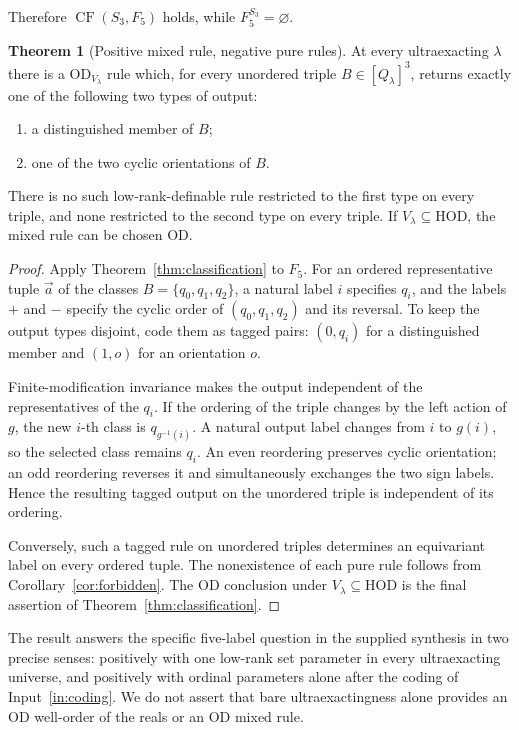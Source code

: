 \documentclass[11pt,letterpaper]{article}
\theoremstyle{definition}
\newtheorem{theorem}[definition]{Theorem}
\numberwithin{equation}{section}
\newcommand{\HOD}{\mathrm{HOD}}
\newcommand{\OD}{\mathrm{OD}}
\newcommand{\CF}{\operatorname{CF}}
\begin{document}
Therefore $\CF(S_3,F_5)$ holds, while $F_5^{S_3}=\varnothing$.

\begin{theorem}[Positive mixed rule, negative pure rules]\label{thm:hybrid}
At every ultraexacting $\lambda$ there is a $\OD_{V_\lambda}$ rule which, for every unordered triple $B\in[Q_\lambda]^3$, returns exactly one of the following two types of output:
\begin{enumerate}
\item a distinguished member of $B$;
\item one of the two cyclic orientations of $B$.
\end{enumerate}
There is no such low-rank-definable rule restricted to the first type on every triple, and none restricted to the second type on every triple. If $V_\lambda\subseteq\HOD$, the mixed rule can be chosen OD.
\end{theorem}

\begin{proof}
Apply Theorem~\ref{thm:classification} to $F_5$. For an ordered representative tuple $\vec a$ of the classes $B=\{q_0,q_1,q_2\}$, a natural label $i$ specifies $q_i$, and the labels $+$ and $-$ specify the cyclic order of $(q_0,q_1,q_2)$ and its reversal. To keep the output types disjoint, code them as tagged pairs: $(0,q_i)$ for a distinguished member and $(1,o)$ for an orientation $o$.

Finite-modification invariance makes the output independent of the representatives of the $q_i$. If the ordering of the triple changes by the left action of $g$, the new $i$-th class is $q_{g^{-1}(i)}$. A natural output label changes from $i$ to $g(i)$, so the selected class remains $q_i$. An even reordering preserves cyclic orientation; an odd reordering reverses it and simultaneously exchanges the two sign labels. Hence the resulting tagged output on the unordered triple is independent of its ordering.

Conversely, such a tagged rule on unordered triples determines an equivariant label on every ordered tuple. The nonexistence of each pure rule follows from Corollary~\ref{cor:forbidden}. The OD conclusion under $V_\lambda\subseteq\HOD$ is the final assertion of Theorem~\ref{thm:classification}.
\end{proof}

The result answers the specific five-label question in the supplied synthesis in two precise senses: positively with one low-rank set parameter in every ultraexacting universe, and positively with ordinal parameters alone after the coding of Input~\ref{in:coding}. We do not assert that bare ultraexactingness alone provides an OD well-order of the reals or an OD mixed rule.
\end{document}
